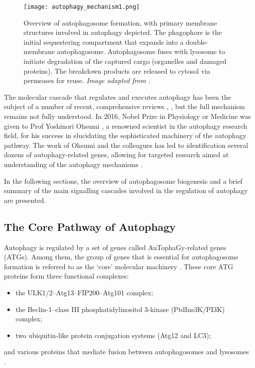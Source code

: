             \begin{figure}[!h]
            \centering
            \texttt{[image: autophagy\_mechanism1.png]}
            \caption[Basic overview of autophagosome formation]{Overview of autophagosome formation, with primary membrane structures involved in autophagy depicted. The phagophore is the initial sequestering compartment that expands into a double-membrane autophagosome. Autophagosome fuses with lysosome to initiate degradation of the captured cargo (organelles and damaged proteins). The breakdown products are released to cytosol via permeases for reuse. \textit{Image adapted from \cite{Feng2015}.} }
            \label{fig:autophagosome}
            \end{figure} 
            
    The molecular cascade that regulates and executes autophagy has been the subject of a number of recent, comprehensive reviews \cite{Feng2015, Abada2014}, \cite{ Fullgrabe2016, Kaur2015}, but the full mechanism remains not fully understood. In 2016, Nobel Prize in Physiology or Medicine was given to Prof Yoshinori Ohsumi \cite{The2016}, a renowned scientist in the autophagy research field, for his success in elucidating the sophisticated machinery of the autophagy pathway. The work of Ohsumi and the colleagues has led to identification several dozens of autophagy-related genes, allowing for targeted research aimed at understanding of the autophagy mechanisms \cite{Feng2015}. 

    In the following sections, the overview of autophagosome biogenesis and a brief summary of the main signalling cascades involved in the regulation of autophagy are presented. 



        \subsection{The Core Pathway of Autophagy } \label{section:automech}
        
        
      Autophagy is regulated by a set of genes called AuTophaGy-related genes (ATGs). Among them, the group of genes that is essential for autophagosome formation is referred to as the ‘core’ molecular machinery \cite{Xie2007}. These core ATG proteins form three functional complexes:
      \begin{itemize}
          \item the ULK1/2--Atg13--FIP200--Atg101 complex; 
          \item the Beclin-1--class III phosphatidylinositol 3-kinase (PtdIns3K/PI3K) complex; 
          \item two ubiquitin-like protein conjugation systems (Atg12 and LC3);
    \end{itemize}
    and various proteins that mediate fusion between autophagosomes and lysosomes \cite{Feng2015, Yang2010}. 

